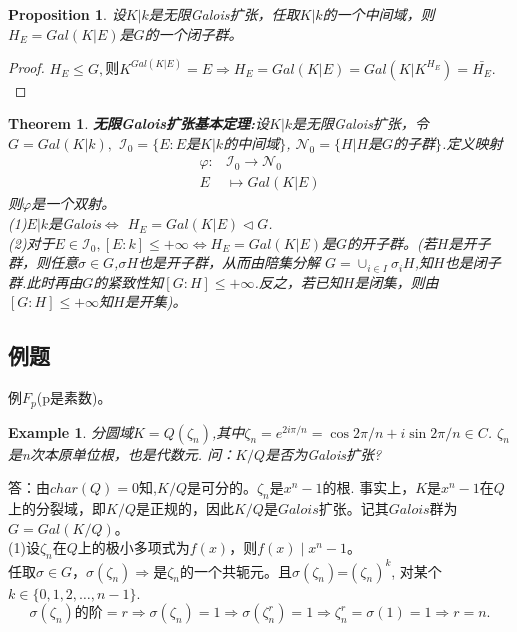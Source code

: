 \documentclass[UTF8]{article}
\newtheorem{thm}{Theorem}[section]
\newtheorem{prop}{Proposition}[section]
\newtheorem{exa}{Example}[section]
\begin{document}
\begin{prop}
设$K|k$是无限Galois扩张，任取$K|k$的一个中间域，则$H_{E}=Gal(K|E)$是$G$的一个闭子群。\end{prop}

\begin{proof}
$H_{E}\leq G,$则$K^{Gal(K|E)}=E\Rightarrow H_{E}=Gal(K|E)=Gal(K|K^{H_{E}})=\bar{H_{E}}.$
\end{proof}
\begin{thm}
\textbf{无限Galois扩张基本定理:}设$K|k$是无限Galois扩张，令$G=Gal(K|k),$ $\mathcal{I}_{0}=\{E:E$是$K|k$的中间域$\}$,
$\mathcal{N}_{0}=\{H|H$是$G$的子群$\}$.定义映射
\[
\begin{split}
\varphi:&\mathcal{I}_{0}\rightarrow \mathcal{N}_{0}\\
E&\mapsto Gal(K|E)
\end{split}
\]
则$\varphi$是一个双射。\\
(1)$E|k$是Galois$\Leftrightarrow$ $H_{E}=Gal(K|E)\triangleleft G$.\\
(2)对于$E\in\mathcal{I}_{0},[E:k]\leq +\infty\Leftrightarrow H_{E}=Gal(K|E)$是$G$的开子群。(若$H$是开子群，则任意$\sigma\in G$,$\sigma H$也是开子群，从而由陪集分解
$G=\cup_{i\in I}\sigma_{i}H$,知$H$也是闭子群.此时再由$G$的紧致性知$[G:H]\leq +\infty$.反之，若已知$H$是闭集，则由$[G:H]\leq +\infty$知$H$是开集)。
\end{thm}
\subsection{例题}
例$F_{p}$(p是素数)。
\begin{exa}
分圆域$K=Q(\zeta_n)$,其中$\zeta_n=e^{2i\pi/n}=\cos{2\pi/n}+i\sin{2\pi/n}\in C$.
$\zeta_n$是n次本原单位根，也是代数元.
问：$K/Q$是否为Galois扩张?
\end{exa}
答：由$char(Q)=0$知,$K/Q$是可分的。$\zeta_n$是$x^n-1$的根.
事实上，$K$是$x^n-1$在$Q$上的分裂域，即$K/Q$是正规的，因此$K/Q$是$Galois$扩张。记其$Galois$群为$G=Gal(K/Q)$。\\


(1)设$\zeta_n$在$Q$上的极小多项式为$f(x)$，则$f(x)\mid x^n-1$。\\
任取$\sigma\in G$，$\sigma(\zeta_n)$$\Rightarrow$是$\zeta_n$的一个共轭元。且$\sigma(\zeta_n)$=$(\zeta_n)^{k}$, 对某个$k\in\{0,1,2,\ldots,n-1\}$.
$$\sigma(\zeta_n)\text{的阶}=r\Rightarrow\sigma(\zeta_n)=1\Rightarrow\sigma(\zeta_n^r)=1\Rightarrow\zeta_n^r=\sigma(1)=1\Rightarrow r=n.$$
\end{document}

